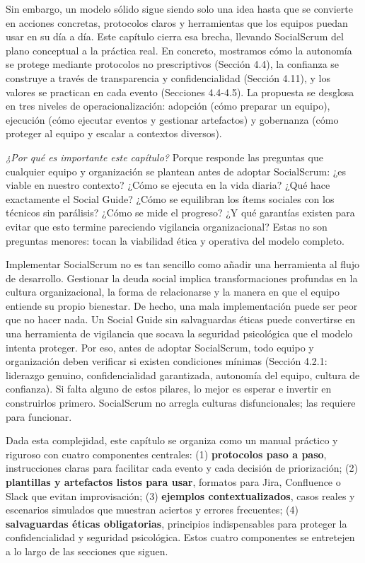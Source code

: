 Sin embargo, un modelo sólido sigue siendo solo una idea hasta que se convierte en acciones concretas, protocolos claros y herramientas que los equipos puedan usar en su día a día. Este capítulo cierra esa brecha, llevando SocialScrum del plano conceptual a la práctica real. En concreto, mostramos cómo la autonomía se protege mediante protocolos no prescriptivos (Sección 4.4), la confianza se construye a través de transparencia y confidencialidad (Sección 4.11), y los valores se practican en cada evento (Secciones 4.4-4.5). La propuesta se desglosa en tres niveles de operacionalización: adopción (cómo preparar un equipo), ejecución (cómo ejecutar eventos y gestionar artefactos) y gobernanza (cómo proteger al equipo y escalar a contextos diversos).

\textit{¿Por qué es importante este capítulo?} Porque responde las preguntas que cualquier equipo y organización se plantean antes de adoptar SocialScrum: ¿es viable en nuestro contexto? ¿Cómo se ejecuta en la vida diaria? ¿Qué hace exactamente el Social Guide? ¿Cómo se equilibran los ítems sociales con los técnicos sin parálisis? ¿Cómo se mide el progreso? ¿Y qué garantías existen para evitar que esto termine pareciendo vigilancia organizacional? Estas no son preguntas menores: tocan la viabilidad ética y operativa del modelo completo.

Implementar SocialScrum no es tan sencillo como añadir una herramienta al flujo de desarrollo. Gestionar la deuda social implica transformaciones profundas en la cultura organizacional, la forma de relacionarse y la manera en que el equipo entiende su propio bienestar. De hecho, una mala implementación puede ser peor que no hacer nada. Un Social Guide sin salvaguardas éticas puede convertirse en una herramienta de vigilancia que socava la seguridad psicológica que el modelo intenta proteger. Por eso, antes de adoptar SocialScrum, todo equipo y organización deben verificar si existen condiciones mínimas (Sección 4.2.1: liderazgo genuino, confidencialidad garantizada, autonomía del equipo, cultura de confianza). Si falta alguno de estos pilares, lo mejor es esperar e invertir en construirlos primero. SocialScrum no arregla culturas disfuncionales; las requiere para funcionar.

Dada esta complejidad, este capítulo se organiza como un manual práctico y riguroso con cuatro componentes centrales: (1) \textbf{protocolos paso a paso}, instrucciones claras para facilitar cada evento y cada decisión de priorización; (2) \textbf{plantillas y artefactos listos para usar}, formatos para Jira, Confluence o Slack que evitan improvisación; (3) \textbf{ejemplos contextualizados}, casos reales y escenarios simulados que muestran aciertos y errores frecuentes; (4) \textbf{salvaguardas éticas obligatorias}, principios indispensables para proteger la confidencialidad y seguridad psicológica. Estos cuatro componentes se entretejen a lo largo de las secciones que siguen.

